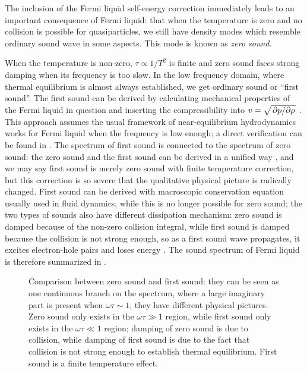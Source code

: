 \documentclass[hyperref, a4paper]{article}
\begin{document}
The inclusion of the Fermi liquid self-energy correction 
immediately leads to an important consequence 
of Fermi liquid: 
that when the temperature is zero and 
no collision is possible for quasiparticles, 
we still have density modes which resemble 
ordinary sound wave in some aspects. 
This mode is known as \emph{zero sound}.

When the temperature is non-zero,
$\tau \propto 1 / T^2$ is finite 
and zero sound faces strong damping 
when its frequency is too slow.
In the low frequency domain, 
where thermal equilibrium is almost always established,
we get ordinary sound or ``first sound''.
The first sound can be derived 
by calculating mechanical properties of the Fermi liquid in question 
and inserting the compressibility 
into $v = \sqrt{\pdv*{p}{\rho}}$ \cite{lifshitz2013statistical}.
This approach assumes the usual framework of near-equilibrium hydrodynamics 
works for Fermi liquid when the frequency is low enough; 
a direct verification can be found in \cite{belitz2022soft}.
The spectrum of first sound 
is connected to the spectrum of zero sound:
the zero sound and the first sound can be derived 
in a unified way \cite{khalatnikov1958dispersion},
and we may say first sound is 
merely zero sound with finite temperature correction, 
but this correction is so severe that the qualitative physical picture 
is radically changed.
First sound can be derived with macroscopic conservation equation 
usually used in fluid dynamics,
while this is no longer possible for zero sound;
the two types of sounds also have different dissipation mechanism:
zero sound is damped because of the non-zero collision integral,
while first sound is damped because the collision is not strong enough,
so as a first sound wave propagates,
it excites electron-hole pairs 
and loses energy
\cite{abel1966propagation,belitz2022soft}. 
The sound spectrum of Fermi liquid is therefore summarized in .

\begin{figure}
    \centering
    
    \caption{Comparison between zero sound and first sound: 
    they can be seen as one continuous branch 
    on the spectrum, 
    where a large imaginary part is present when $\omega \tau \sim 1$,
    they have different physical pictures.
    Zero sound only exists in the $\omega \tau \gg 1$ region,
    while first sound only exists in the $\omega \tau \ll 1$ region;
    damping of zero sound is due to collision,
    while damping of first sound is due to the fact that
    collision is not strong enough to establish thermal equilibrium.
    First sound is a finite temperature effect.}
    \label{fig:sound-comparison}
\end{figure}
\end{document}
